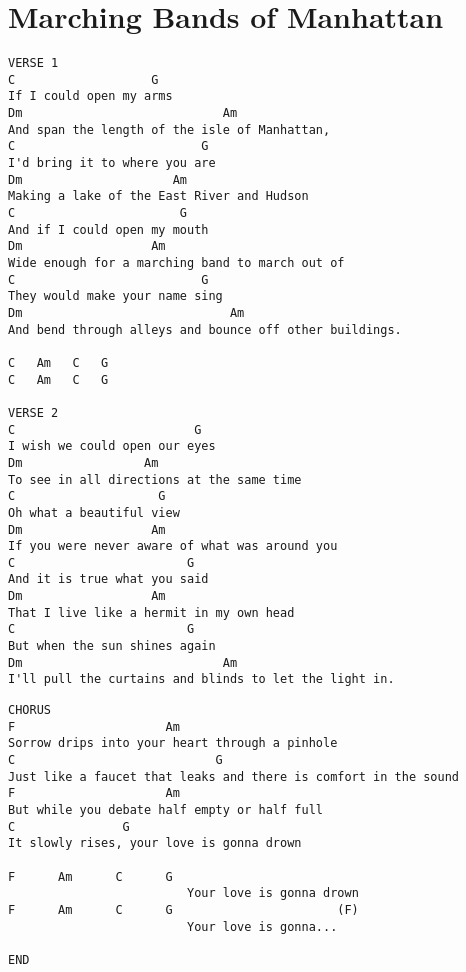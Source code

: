 \documentclass[leqno]{memoir}
\begin{document}
\chapter{Marching Bands of Manhattan}
\begin{verbatim}
VERSE 1
C                   G
If I could open my arms 
Dm                            Am
And span the length of the isle of Manhattan, 
C                          G
I'd bring it to where you are 
Dm                     Am
Making a lake of the East River and Hudson 
C                       G
And if I could open my mouth 
Dm                  Am
Wide enough for a marching band to march out of 
C                          G
They would make your name sing 
Dm                             Am
And bend through alleys and bounce off other buildings. 

C   Am   C   G   
C   Am   C   G

VERSE 2
C                         G
I wish we could open our eyes 
Dm                 Am
To see in all directions at the same time 
C                    G
Oh what a beautiful view 
Dm                  Am
If you were never aware of what was around you 
C                        G
And it is true what you said 
Dm                  Am
That I live like a hermit in my own head 
C                        G
But when the sun shines again 
Dm                            Am
I'll pull the curtains and blinds to let the light in. 
\end{verbatim}
\newpage
\begin{verbatim}
CHORUS
F                     Am               
Sorrow drips into your heart through a pinhole 
C                            G
Just like a faucet that leaks and there is comfort in the sound 
F                     Am
But while you debate half empty or half full 
C               G
It slowly rises, your love is gonna drown

F      Am      C      G
                         Your love is gonna drown
F      Am      C      G                       (F)
                         Your love is gonna...

END

\end{verbatim}
\newpage
\end{document}

